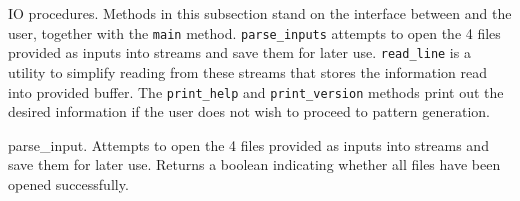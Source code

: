 \fi

IO procedures.
Methods in this subsection stand on the interface between \utfpatgen{} and the
user, together with the {\tt main}
method. {\tt parse\_inputs} attempts to open the 4 files provided as inputs
into streams and save them for later
use. {\tt read\_line} is a utility to simplify reading from these streams that
stores the information read into
provided buffer. The {\tt print\_help} and {\tt print\_version} methods print
out the desired information if the
user does not wish to proceed to pattern generation.

\fi

parse\_input.
Attempts to open the 4 files provided as inputs into streams and save them for
later use. Returns a boolean indicating
whether all files have been opened successfully.

